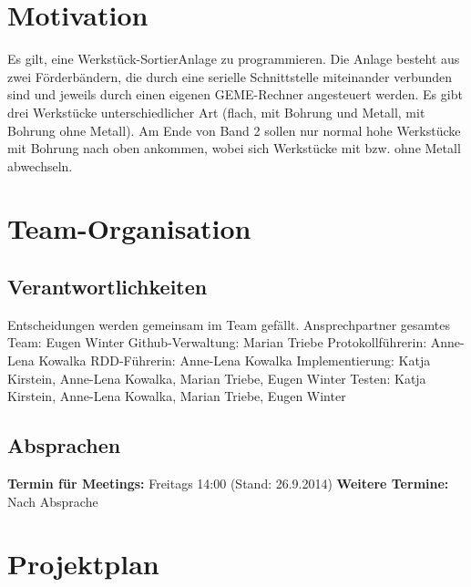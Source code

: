 \documentclass[oneside,a4paper,titlepage]{scrartcl} %
\begin{document}
\tableofcontents

\newpage

\section{Motivation}
Es gilt, eine Werkstück-SortierAnlage zu programmieren. Die Anlage besteht aus zwei
Förderbändern, die durch eine serielle Schnittstelle miteinander verbunden sind und jeweils durch
einen eigenen GEME-Rechner angesteuert werden.
Es gibt drei Werkstücke unterschiedlicher Art (flach, mit Bohrung und Metall, mit Bohrung ohne
Metall). Am Ende von Band 2 sollen nur normal hohe Werkstücke mit Bohrung nach oben
ankommen, wobei sich Werkstücke mit bzw. ohne Metall abwechseln.

\section{Team-Organisation}

\subsection{Verantwortlichkeiten}
Entscheidungen werden gemeinsam im Team gefällt.\newline
Ansprechpartner gesamtes Team: Eugen Winter\newline
Github-Verwaltung: Marian Triebe\newline
Protokollführerin: Anne-Lena Kowalka\newline
RDD-Führerin: Anne-Lena Kowalka\newline
Implementierung: Katja Kirstein, Anne-Lena Kowalka, Marian Triebe, Eugen Winter\newline
Testen: Katja Kirstein, Anne-Lena Kowalka, Marian Triebe, Eugen Winter\newline

\subsection{Absprachen}
\textbf{Termin für Meetings:} Freitags 14:00 (Stand: 26.9.2014)\newline
\textbf{Weitere Termine:} Nach Absprache

\newpage

\section{Projektplan}
\end{document}

